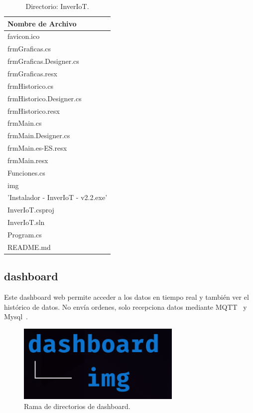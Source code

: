 \begin{table}[htbp]
\begin{center}
	\caption{Directorio: InverIoT.}
\begin{tabular}{|l|} %
\hline
\rowcolor[HTML]{C0C0C0} 
\textbf{Nombre de Archivo}\\ \hline
favicon.ico \\ \hline
frmGraficas.cs \\ \hline
frmGraficas.Designer.cs \\ \hline
frmGraficas.resx  \\ \hline
frmHistorico.cs  \\ \hline
frmHistorico.Designer.cs  \\ \hline
frmHistorico.resx  \\ \hline
frmMain.cs  \\ \hline
frmMain.Designer.cs  \\ \hline
frmMain.es-ES.resx  \\ \hline
frmMain.resx  \\ \hline
Funciones.cs  \\ \hline
img  \\ \hline
'Instalador - InverIoT - v2.2.exe'  \\ \hline
InverIoT.csproj  \\ \hline
InverIoT.sln  \\ \hline
Program.cs  \\ \hline
README.md  \\ \hline
\end{tabular}
\label{tabla:directorioInverIoT}
\end{center}
\end{table}

\subsection{dashboard}
Este dashboard web permite acceder a los datos en tiempo real y también ver el histórico de datos. No envía ordenes, solo recepciona datos mediante MQTT~\cite{manual:MQTT} y Mysql~\cite{misc:Mysql}.

\begin{figure}[h]
\centering
\includegraphics[width=0.7\textwidth]{img/diagramas/directorios_dashboard.png}
\caption{Rama de directorios de dashboard.}
\end{figure}

